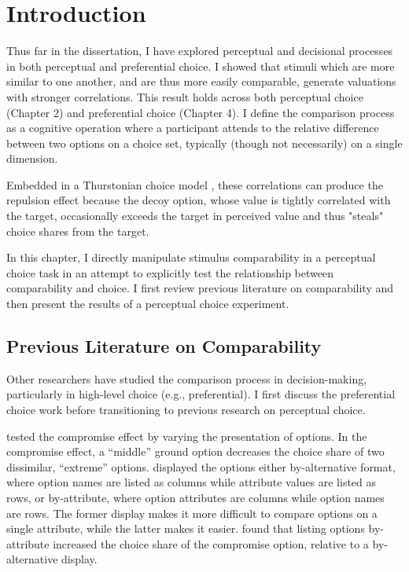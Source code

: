 \section{Introduction}

Thus far in the dissertation, I have explored perceptual and decisional processes in both perceptual and preferential choice. I showed that stimuli which are more similar to one another, and are thus more easily comparable, generate valuations with stronger correlations. This result holds across both perceptual choice (Chapter 2) and preferential choice (Chapter 4). I define the comparison process as a cognitive operation where a participant attends to the relative difference between two options on a choice set, typically (though not necessarily) on a single dimension. 

Embedded in a Thurstonian choice model \parencite{thurstone1927law}, these correlations can produce the repulsion effect \parencite{spektorWhenGoodLooks2018b,simonson2014vices} because the decoy option, whose value is tightly correlated with the target, occasionally exceeds the target in perceived value and thus "steals" choice shares from the target. 

In this chapter, I directly manipulate stimulus comparability in a perceptual choice task in an attempt to explicitly test the relationship between comparability and choice. I first review previous literature on comparability and then present the results of a perceptual choice experiment.

\subsection{Previous Literature on Comparability}

Other researchers have studied the comparison process in decision-making, particularly in high-level choice (e.g., preferential). I first discuss the preferential choice work before transitioning to previous research on perceptual choice. 

\textcite{changWhichCompromiseOption2008} tested the compromise effect by varying the presentation of options. In the compromise effect, a “middle” ground option decreases the choice share of two dissimilar, “extreme” options. \textcite{changWhichCompromiseOption2008} displayed the options either by-alternative format, where option names are listed as columns while attribute values are listed as rows, or by-attribute, where option attributes are columns while option names are rows. The former display makes it more difficult to compare options on a single attribute, while the latter makes it easier. \textcite{changWhichCompromiseOption2008} found that listing options by-attribute increased the choice share of the compromise option, relative to a by-alternative display. 

